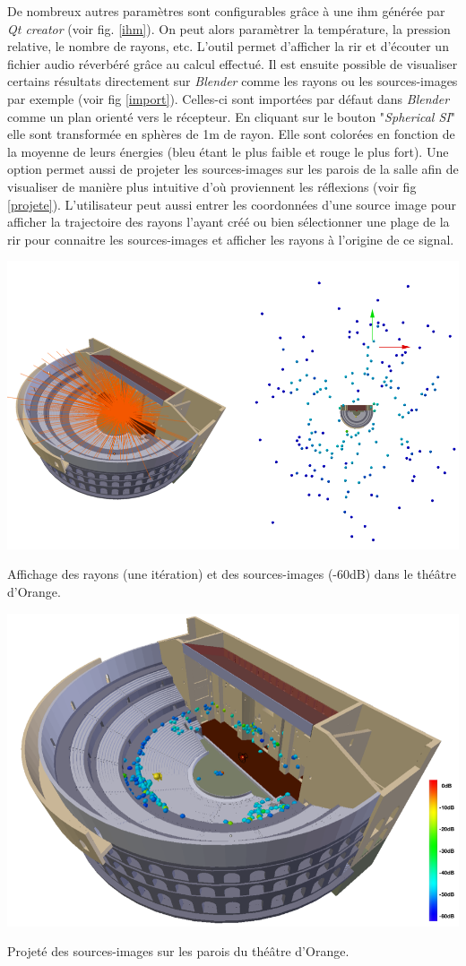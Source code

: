 De nombreux autres paramètres sont configurables grâce à une \gls{ihm} générée par \textit{Qt creator} (voir fig. \ref{ihm}). On peut alors paramètrer la température, la pression relative, le nombre de rayons, etc. L'outil permet d'afficher la \gls{rir} et d'écouter un fichier audio réverbéré grâce au calcul effectué. Il est ensuite possible de visualiser certains résultats directement sur \textit{Blender} comme les rayons ou les sources-images par exemple (voir fig \ref{import}). Celles-ci sont importées par défaut dans \textit{Blender} comme un plan orienté vers le récepteur. En cliquant sur le bouton "\textit{Spherical SI}" elle sont transformée en sphères de 1m de rayon. Elle sont colorées en fonction de la moyenne de leurs énergies (bleu étant le plus faible et rouge le plus fort). Une option permet aussi de projeter les sources-images sur les parois de la salle afin de visualiser de manière plus intuitive d'où proviennent les réflexions (voir fig \ref{projete}). L'utilisateur peut aussi entrer les coordonnées d'une source image pour afficher la trajectoire des rayons l'ayant créé ou bien sélectionner une plage de la \gls{rir} pour connaitre les sources-images et afficher les rayons à l'origine de ce signal.
\begin{figureth}
	\includegraphics[width=\linewidth]{images/import}
	\caption{Affichage des rayons (une itération) et des sources-images (-60dB) dans le théâtre d'Orange.}
	\label{import}
\end{figureth}


\begin{figureth}
	\includegraphics[width=0.8\linewidth]{images/projete}
	\caption{Projeté des sources-images sur les parois du théâtre d'Orange.}
	\label{projete}
\end{figureth}


